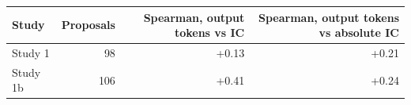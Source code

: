 \begin{tabular}{lrrr}
\toprule
Study & Proposals & Spearman, output tokens vs IC & Spearman, output tokens vs absolute IC \\
\midrule
Study 1 & 98 & +0.13 & +0.21 \\
Study 1b & 106 & +0.41 & +0.24 \\
\bottomrule
\end{tabular}
